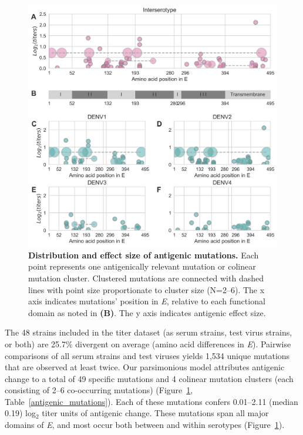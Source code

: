 \documentclass[11pt,oneside,letterpaper]{article}
\begin{document}
\begin{figure}[ht]
  \begin{centering}
  \includegraphics[width=\textwidth]{../figures/png/mutations_position_db.png}
  	\caption{\textbf{Distribution and effect size of antigenic mutations.}
	  Each point represents one antigenically relevant mutation or colinear mutation cluster.
    Clustered mutations are connected with dashed lines with point size proportionate to cluster size (N=2--6).
    The x axis indicates mutations' position in \textit{E}, relative to each functional domain as noted in \textbf{(B)}.
    The y axis indicates antigenic effect size.}
  	\label{mutation_positions}
  \end{centering}
\end{figure}

The 48 strains included in the titer dataset (as serum strains, test virus strains, or both) are 25.7\% divergent on average (amino acid differences in \textit{E}).
Pairwise comparisons of all serum strains and test viruses yields 1,534 unique mutations that are observed at least twice.
Our parsimonious model attributes antigenic change to a total of 49 specific mutations and 4 colinear mutation clusters (each consisting of 2--6 co-occurring mutations) (Figure~\ref{mutation_positions}, Table~\ref{antigenic_mutations}).
Each of these mutations confers 0.01--2.11 (median 0.19) log$_2$ titer units of antigenic change.
These mutations span all major domains of \textit{E}, and most occur both between and within serotypes (Figure~\ref{mutation_positions}).
\end{document}
